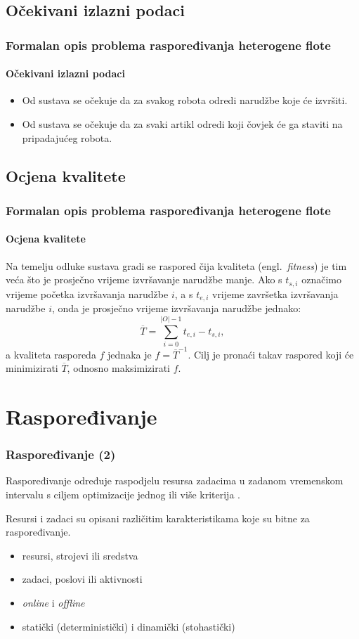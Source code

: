 \documentclass{beamer}
\newcommand{\engl}[1]{(engl.~\emph{#1})}
\begin{document}
\subsection{Očekivani izlazni podaci}
\begin{frame}
\frametitle{Formalan opis problema raspoređivanja heterogene flote}
\framesubtitle{Očekivani izlazni podaci}
\begin{itemize}
    \item Od sustava se očekuje da za svakog robota odredi narudžbe koje će izvršiti.
    \item Od sustava se očekuje da za svaki artikl odredi koji čovjek će ga staviti na pripadajućeg robota.
\end{itemize}
\end{frame}

\subsection{Ocjena kvalitete}
\begin{frame}
\frametitle{Formalan opis problema raspoređivanja heterogene flote}
\framesubtitle{Ocjena kvalitete}
Na temelju odluke sustava gradi se raspored čija kvaliteta \engl{fitness} je tim
veća što je prosječno vrijeme izvršavanje narudžbe manje. Ako s
$t_{s, i}$ označimo vrijeme početka izvršavanja narudžbe $i$, a s $t_{e, i}$
vrijeme završetka izvršavanja narudžbe $i$, onda je prosječno vrijeme izvršavanja
narudžbe jednako:
\begin{equation}
    \overline{T} = \sum_{i = 0}^{|O| - 1}{t_{e, i} - t_{s, i}},
\end{equation}
a kvaliteta rasporeda $f$ jednaka je $f = \overline{T}^{-1}$. Cilj je
pronaći takav raspored koji će minimizirati $\overline{T}$, odnosno
maksimizirati $f$.
\end{frame}

\section{Raspoređivanje}
\begin{frame}
\frametitle{Raspoređivanje (2)}
Raspoređivanje određuje raspodjelu resursa zadacima u zadanom vremenskom
intervalu s ciljem optimizacije jednog ili više kriterija \citep{michael2018scheduling}.
\vspace{0.5cm}

Resursi i zadaci su opisani različitim karakteristikama koje su bitne za raspoređivanje.
\vspace{0.5cm}
\begin{itemize}
    \item resursi, strojevi ili sredstva
    \item zadaci, poslovi ili aktivnosti
    \item \textit{online} i \textit{offline}
    \item statički (deterministički) i dinamički (stohastički)
\end{itemize}
\end{frame}
\end{document}
